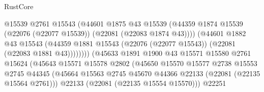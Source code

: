 \begin{lexlean}{RustCore}
\begin{coremodule}
                                            @15539
                                            @2761
                                            @15543
                                            (@44601
                                              @1875
                                              @43
                                              @15539
                                              (@44359
                                                @1874
                                                @15539
                                                (@22076 (@22077 @15539))
                                                (@22081 (@22083 @1874 @43))))
                                            (@44601
                                              @1882
                                              @43
                                              @15543
                                              (@44359
                                                @1881
                                                @15543
                                                (@22076 (@22077 @15543))
                                                (@22081 (@22083 @1881 @43))))))))
                                    (@45633
                                      @1891
                                      @1900
                                      @43
                                      @15571
                                      @15580
                                      @2761
                                      @15624
                                      (@45643
                                        @15571
                                        @15578
                                        @2802
                                        (@45650
                                          @15570
                                          @15577
                                          @2738
                                          @15553
                                          @2745
                                          @44345
                                          (@45664
                                            @15563
                                            @2745
                                            @45670
                                            @44366
                                            @22133
                                            (@22081 (@22135 @15564 @2761)))
                                          @22133
                                          (@22081 (@22135 @15554 @15570)))
                                        @22251

\end{coremodule}
\end{lexlean}
